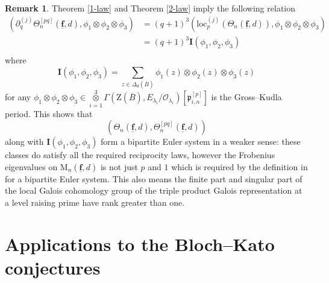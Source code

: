 \documentclass[10pt]{amsart}
\numberwithin{equation}{section}
\theoremstyle{plain}
\numberwithin{equation}{section}
\theoremstyle{definition}
\newtheorem{remark}[equation]{Remark}
\theoremstyle{remark}
\def\loc{\mathrm{loc}}
\def\triplef{\underline{\mathbf{f}}}
\def\threetensor{\overset{3}{\underset{i=1}\otimes}}
\def\calO{\mathcal{O}}
\def\frakp{\mathfrak{p}}
\def\rmM{\mathrm{M}}
\def\rmZ{\mathrm{Z}}
\begin{document}
 \begin{remark}
 Theorem \ref{1-law} and Theorem \ref{2-law} imply the following  relation
\begin{equation*}
\begin{aligned}
(\partial^{(j)}_{q}\Theta^{ [pq]} _{n}(\triplef,d), \phi_{1}\otimes \phi_{2}\otimes \phi_{3})
&=(q+1)^{3}(\loc^{(j)}_{p}(\Theta_{n}(\triplef, d)), \phi_{1}\otimes\phi_{2}\otimes\phi_{3})\\ 
&= (q+1)^{3}\mathbf{I}(\phi_{1}, \phi_{2}, \phi_{3})\\
\end{aligned}
\end{equation*}
where 
\begin{equation*}
\mathbf{I}(\phi_{1}, \phi_{2}, \phi_{3})=\sum_{z\in \Delta_{d}(\overline{B})} \phi_{1}(z)\otimes \phi_{2}(z)\otimes \phi_{3}(z) 
\end{equation*}
for any $\phi_{1}\otimes\phi_{2}\otimes \phi_{3}\in \threetensor\Gamma(\rmZ(\overline{B}),E_{\lambda_{i}}/\calO_{\lambda_{i}})[\frakp^{[p]}_{i, n}]$ is the Gross--Kudla period. This shows that 
\begin{equation*}
(\Theta_{n}(\triplef, d), \Theta^{[pq]}_{n}(\triplef, d)) 
\end{equation*}
along with $\mathbf{I}(\phi_{1}, \phi_{2}, \phi_{3})$ form a bipartite Euler system in a weaker sense: these classes do satisfy all the required reciprocity laws, however the Frobenius eigenvalues on $\rmM_{n}(\triplef, d)$ is not just $p$ and $1$ which is required by the definition in \cite{How} for a bipartite Euler system. This also means the finite part and singular part of the local Galois cohomology group of the triple product Galois representation at a level raising prime have rank greater than one.
 
 \end{remark}
 
\section{Applications to the Bloch--Kato conjectures}
\end{document}
